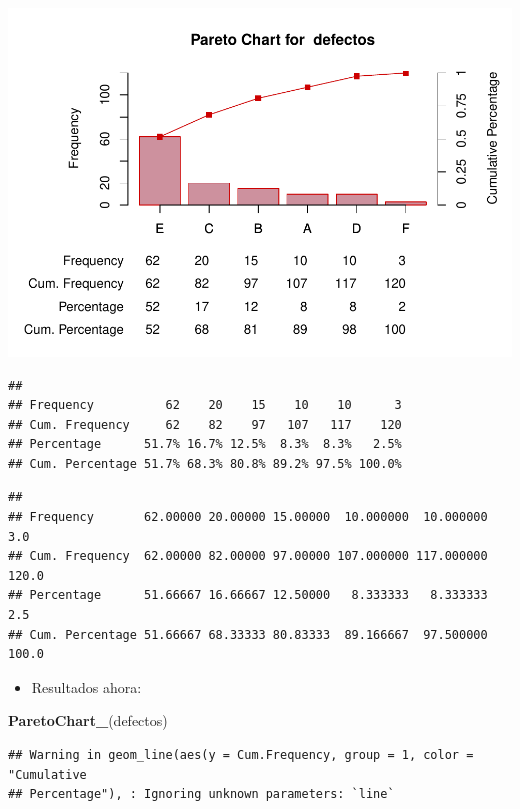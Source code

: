 \documentclass[
]{book}
\newenvironment{Shaded}{\begin{snugshade}}{\end{snugshade}}
\newcommand{\FunctionTok}[1]{\textcolor[rgb]{0.13,0.29,0.53}{\textbf{#1}}}
\newcommand{\NormalTok}[1]{#1}
\providecommand{\tightlist}{%
  \setlength{\itemsep}{0pt}\setlength{\parskip}{0pt}}
\begin{document}
\includegraphics{Libro_TidyQualityTools_files/figure-latex/unnamed-chunk-137-1.pdf}

\begin{verbatim}
##                                                     
## Frequency          62    20    15    10    10      3
## Cum. Frequency     62    82    97   107   117    120
## Percentage      51.7% 16.7% 12.5%  8.3%  8.3%   2.5%
## Cum. Percentage 51.7% 68.3% 80.8% 89.2% 97.5% 100.0%
\end{verbatim}

\begin{verbatim}
##                                                                       
## Frequency       62.00000 20.00000 15.00000  10.000000  10.000000   3.0
## Cum. Frequency  62.00000 82.00000 97.00000 107.000000 117.000000 120.0
## Percentage      51.66667 16.66667 12.50000   8.333333   8.333333   2.5
## Cum. Percentage 51.66667 68.33333 80.83333  89.166667  97.500000 100.0
\end{verbatim}

\begin{itemize}
\tightlist
\item
  Resultados ahora:
\end{itemize}

\begin{Shaded}
\begin{Highlighting}[]
\FunctionTok{ParetoChart\_}\NormalTok{(defectos)}
\end{Highlighting}
\end{Shaded}

\begin{verbatim}
## Warning in geom_line(aes(y = Cum.Frequency, group = 1, color = "Cumulative
## Percentage"), : Ignoring unknown parameters: `line`
\end{verbatim}
\end{document}
